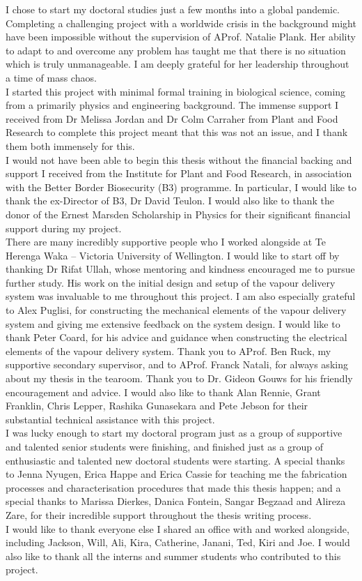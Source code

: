 I chose to start my doctoral studies just a few months into a global pandemic. Completing a challenging project with a worldwide crisis in the background might have been impossible without the supervision of AProf. Natalie Plank. Her ability to adapt to and overcome any problem has taught me that there is no situation which is truly unmanageable. I am deeply grateful for her leadership throughout a time of mass chaos. \\[5pt] I started this project with minimal formal training in biological science, coming from a primarily physics and engineering background. The immense support I received from Dr Melissa Jordan and Dr Colm Carraher from Plant and Food Research to complete this project meant that this was not an issue, and I thank them both immensely for this. \\[5pt] I would not have been able to begin this thesis without the financial backing and support I received from the Institute for Plant and Food Research, in association with the Better Border Biosecurity (B3) programme. In particular, I would like to thank the ex-Director of B3, Dr David Teulon. I would also like to thank the donor of the Ernest Marsden Scholarship in Physics for their significant financial support during my project. \\[5pt] There are many incredibly supportive people who I worked alongside at Te Herenga Waka – Victoria University of Wellington. I would like to start off by thanking Dr Rifat Ullah, whose mentoring and kindness encouraged me to pursue further study. His work on the initial design and setup of the vapour delivery system was invaluable to me throughout this project. I am also especially grateful to Alex Puglisi, for constructing the mechanical elements of the vapour delivery system and giving me extensive feedback on the system design. I would like to thank Peter Coard, for his advice and guidance when constructing the electrical elements of the vapour delivery system. Thank you to AProf. Ben Ruck, my supportive secondary supervisor, and to AProf. Franck Natali, for always asking about my thesis in the tearoom. Thank you to Dr. Gideon Gouws for his friendly encouragement and advice. I would also like to thank Alan Rennie, Grant Franklin, Chris Lepper, Rashika Gunasekara and Pete Jebson for their substantial technical assistance with this project. \\[5pt] I was lucky enough to start my doctoral program just as a group of supportive and talented senior students were finishing, and finished just as a group of enthusiastic and talented new doctoral students were starting. A special thanks to Jenna Nyugen, Erica Happe and Erica Cassie for teaching me the fabrication processes and characterisation procedures that made this thesis happen; and a special thanks to Marissa Dierkes, Danica Fontein, Sangar Begzaad and Alireza Zare, for their incredible support throughout the thesis writing process. \\[5pt] I would like to thank everyone else I shared an office with and worked alongside, including Jackson, Will, Ali, Kira, Catherine, Janani, Ted, Kiri and Joe. I would also like to thank all the interns and summer students who contributed to this project. 